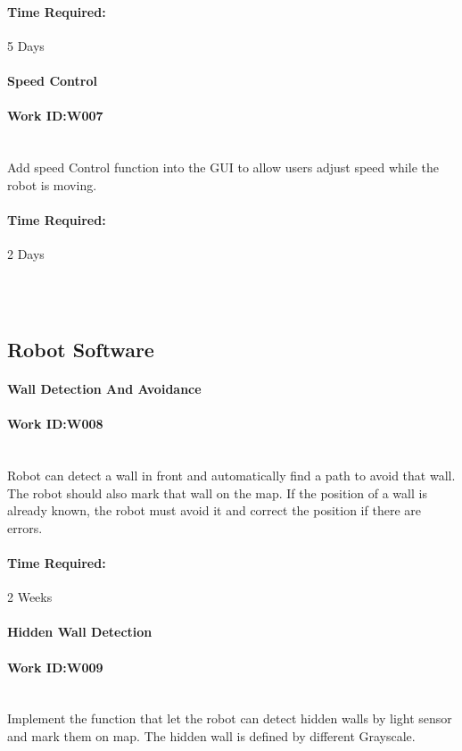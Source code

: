 \documentclass[11pt, a4paper]{report}
\begin{document}
\paragraph{Time Required:}5 Days



\paragraph{Speed Control}
\paragraph{Work ID:W007}\\
Add speed Control function into the GUI to allow users adjust speed while the robot is moving.
\paragraph{Time Required:}2 Days

\\
\\

\subsection{Robot Software}

\paragraph{Wall Detection And Avoidance}
\paragraph{Work ID:W008}\\
Robot can detect a wall in front and automatically find a path to avoid that wall. The robot should also mark that wall on the map. If the position of a wall is already known, the robot must avoid it and correct the position if there are errors.
\paragraph{Time Required:}2 Weeks


\paragraph{Hidden Wall Detection}
\paragraph{Work ID:W009}\\
Implement the function that let the robot can detect hidden walls by light sensor and mark them on map. The hidden wall is defined by different Grayscale.
\end{document}
